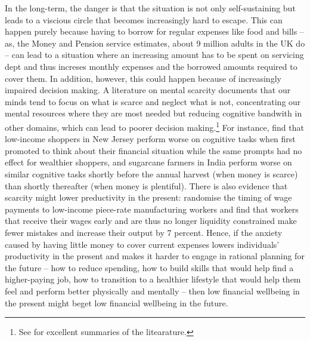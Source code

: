 In the long-term, the danger is that the situation is not only self-sustaining
but leads to a viscious circle that becomes increasingly hard to escape. This
can happen purely because having to borrow for regular expenses like food and
bills -- as, the Money and Pension service estimates, about 9 million adults in
the UK do \citep{mps2018building} -- can lead to a situation where an
increasing amount has to be spent on servicing dept and thus increses monthly
expenses and the borrowed amounts required to cover them. In addition, however,
this could happen because of increasingly impaired decision making. A
literature on mental scarcity documents that our minds tend to focus on what is
scarce and neglect what is not, concentrating our mental resources where they
are most needed but reducing cognitive bandwith in other domains, which can
lead to poorer decision making.\footnote{See \citet{shah2012some,
    mullainathan2013scarcity, haushofer2014psychology} for excellent summaries
of the litearature.} For instance, \citet{mani2013poverty} find that low-income
shoppers in New Jersey perform worse on cognitive tasks when first promoted to
think about their financial situation while the same prompts had no effect for
wealthier shoppers, and sugarcane farmers in India perform worse on similar
cognitive tasks shortly before the annual harvest (when money is scarce) than
shortly thereafter (when money is plentiful). There is also evidence that
scarcity might lower preductivity in the present: \citet{kaur2021financial}
randomise the timing of wage payments to low-income piece-rate manufacturing
workers and find that workers that receive their wages early and are thus no
longer liquidity constrained make fewer mistakes and increase their output by 7
percent. Hence, if the anxiety caused by having little money to cover current
expenses lowers individuals' productivity in the present and makes it harder to
engage in rational planning for the future -- how to reduce spending, how to
build skills that would help find a higher-paying job, how to transition to a
healthier lifestyle that would help them feel and perform better physically and
mentally -- then low financial wellbeing in the present might beget low
financial wellbeing in the future.

